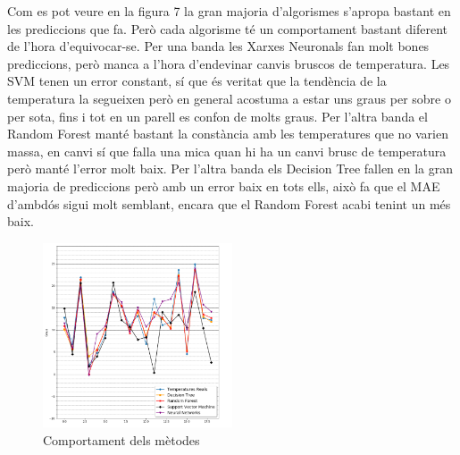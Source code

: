 \documentclass[10pt,a4paper,twocolumn,twoside]{article}
\begin{document}
Com es pot veure en la figura 7 la gran majoria d'algorismes s'apropa bastant en les prediccions que fa. Però cada algorisme té un comportament bastant diferent de l'hora d'equivocar-se. Per una banda les Xarxes Neuronals fan molt bones prediccions, però manca a l'hora d'endevinar canvis bruscos de temperatura. Les SVM tenen un error constant, sí que és veritat que la tendència de la temperatura la segueixen però en general acostuma a estar uns graus per sobre o per sota, fins i tot en un parell es confon de molts graus.
Per l'altra banda el Random Forest manté bastant la constància amb les temperatures que no varien massa, en canvi sí que falla una mica quan hi ha un canvi brusc de temperatura però manté l'error molt baix. Per l'altra banda els Decision Tree fallen en la gran majoria de prediccions però amb un error baix en tots ells, això fa que el MAE d'ambdós sigui molt semblant, encara que el Random Forest acabi tenint un més baix.

\begin{figure}[!h]
\centering
	\includegraphics[width=0.5\textwidth]{../img/comparacioAlgs}
	\caption{Comportament dels mètodes}
	\label{fig-temps}
\end{figure}
\end{document}
